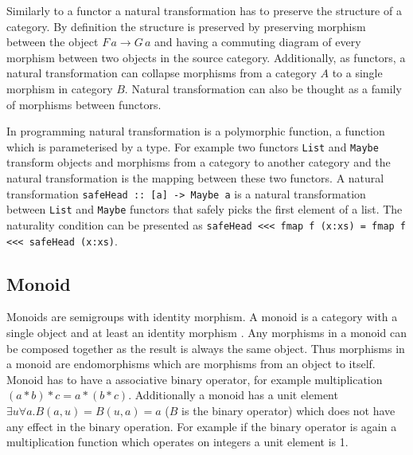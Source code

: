\documentclass[article]{aaltoseries}
\begin{document}
    Similarly to a functor a natural transformation has to preserve the
    structure of a category. By definition the structure is preserved by
    preserving morphism between the object $F\, a \rightarrow G\, a$ and having a
    commuting diagram of every morphism between two objects in the source
    category. Additionally, as functors, a natural transformation can collapse
    morphisms from a category $A$ to a single morphism in category $B$. Natural
    transformation can also be thought as a family of morphisms between functors.
 
    In programming natural transformation is a polymorphic function, a function
    which is parameterised by a type. For example two functors \lstinline|List|
    and \lstinline|Maybe| transform objects and morphisms from a category to
    another category and the natural transformation is the mapping between these
    two functors. A natural transformation
    \lstinline|safeHead :: [a] -> Maybe a| is a natural transformation between
    \lstinline|List| and \lstinline|Maybe| functors that safely picks the first
    element of a list. The naturality condition can be presented as
    \lstinline|safeHead <<< fmap f (x:xs) = fmap f <<< safeHead (x:xs)|.

    
  \subsection{Monoid}
    Monoids are semigroups with identity morphism. A monoid is a category with a
    single object and at least an identity morphism \cite{barr1990category,
      awodey2006category, mac2013categories, yorgey2012monoids}. Any morphisms
    in a monoid can be composed together as the result is always the same
    object. Thus morphisms in a monoid are endomorphisms which are morphisms
    from an object to itself. Monoid has to have a associative binary operator,
    for example multiplication $(a * b) * c = a * (b * c)$. Additionally a
    monoid has a unit element $\exists u \forall a. B(a,u) = B(u,a) = a$ ($B$ is
    the binary operator) which does not have any effect in the binary operation.
    For example if the binary operator is again a multiplication function which
    operates on integers a unit element is 1.

\end{document}
